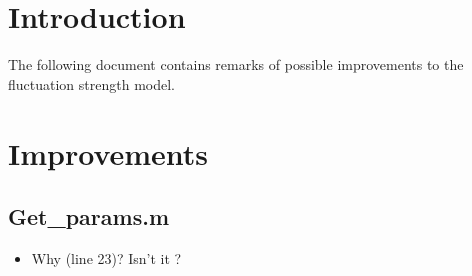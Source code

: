 \documentclass[a4paper]{article}
\begin{document}

\section{Introduction} %
\label{sec:introduction}

The following document contains remarks of possible improvements to the
fluctuation strength model.


\section{Improvements} %
\label{sec:improvements}

\subsection{Get\_params.m} %
\label{sub:get_params_m}

\begin{itemize}
  \item Why  (line 23)? Isn't it
    ?
\end{itemize}


\end{document}
